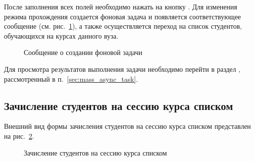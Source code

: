 После заполнения всех полей необходимо нажать на кнопку . Для изменения режима прохождения  
создается фоновая задача и появляется соответствующее сообщение (см. рис.~\ref{img:student:student_change_mode_task}), 
а также осуществляется переход на список студентов, обучающихся на курсах данного вуза.
\begin{figure}[H]
	\caption{Сообщение о создании фоновой задачи}
	\label{img:student:student_change_mode_task}
\end{figure}
Для просмотра результатов выполнения задачи необходимо перейти в раздел , 
рассмотренный в п.~\ref{sec:mass_async_task}.


\subsection{Зачисление студентов на сессию курса списком}
Внешний вид формы зачисления студентов на сессию курса списком представлен на рис.~\ref{img:student:mass_enroll}.

\begin{figure}[H]
	\caption{Зачисление студентов на сессию курса списком}
	\label{img:student:mass_enroll}
\end{figure}

